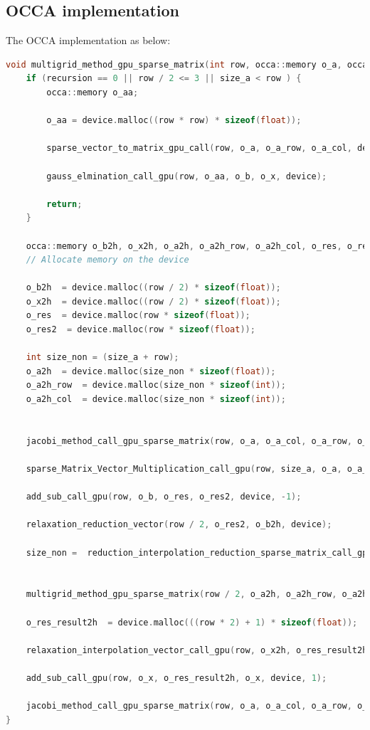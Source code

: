 \subsection{OCCA implementation}
The OCCA implementation as below:\\
\begin{lstlisting}[language=C, caption=multigrid method in OCCA]
	void multigrid_method_gpu_sparse_matrix(int row, occa::memory o_a, occa::memory o_a_row, occa::memory o_a_col, occa::memory o_b, occa::memory o_x, occa::device device, int recursion, int alpha, int size_a) {
    if (recursion == 0 || row / 2 <= 3 || size_a < row ) {
        occa::memory o_aa;

        o_aa = device.malloc((row * row) * sizeof(float));

        sparse_vector_to_matrix_gpu_call(row, o_a, o_a_row, o_a_col, device, size_a, o_aa);

        gauss_elmination_call_gpu(row, o_aa, o_b, o_x, device);

        return;
    }

    occa::memory o_b2h, o_x2h, o_a2h, o_a2h_row, o_a2h_col, o_res, o_res2, o_res_result2h, o_row_number ;
    // Allocate memory on the device

    o_b2h  = device.malloc((row / 2) * sizeof(float));
    o_x2h  = device.malloc((row / 2) * sizeof(float));
    o_res  = device.malloc(row * sizeof(float));
    o_res2  = device.malloc(row * sizeof(float));

    int size_non = (size_a + row);
    o_a2h  = device.malloc(size_non * sizeof(float));
    o_a2h_row  = device.malloc(size_non * sizeof(int));
    o_a2h_col  = device.malloc(size_non * sizeof(int));


    jacobi_method_call_gpu_sparse_matrix(row, o_a, o_a_col, o_a_row, o_b, o_x, device,  alpha, size_a);

    sparse_Matrix_Vector_Multiplication_call_gpu(row, size_a, o_a, o_a_row, o_a_col, o_x, o_res, device);

    add_sub_call_gpu(row, o_b, o_res, o_res2, device, -1);

    relaxation_reduction_vector(row / 2, o_res2, o_b2h, device);

    size_non =  reduction_interpolation_reduction_sparse_matrix_call_gpu(row, o_a, o_a_col, o_a_row,  o_a2h, o_a2h_row, o_a2h_col, device, size_a);


    multigrid_method_gpu_sparse_matrix(row / 2, o_a2h, o_a2h_row, o_a2h_col, o_b2h, o_x2h, device, recursion - 1, alpha, size_non);

    o_res_result2h  = device.malloc(((row * 2) + 1) * sizeof(float));

    relaxation_interpolation_vector_call_gpu(row, o_x2h, o_res_result2h, device);

    add_sub_call_gpu(row, o_x, o_res_result2h, o_x, device, 1);

    jacobi_method_call_gpu_sparse_matrix(row, o_a, o_a_col, o_a_row, o_b, o_x, device,  alpha, size_a);
}
\end{lstlisting}

